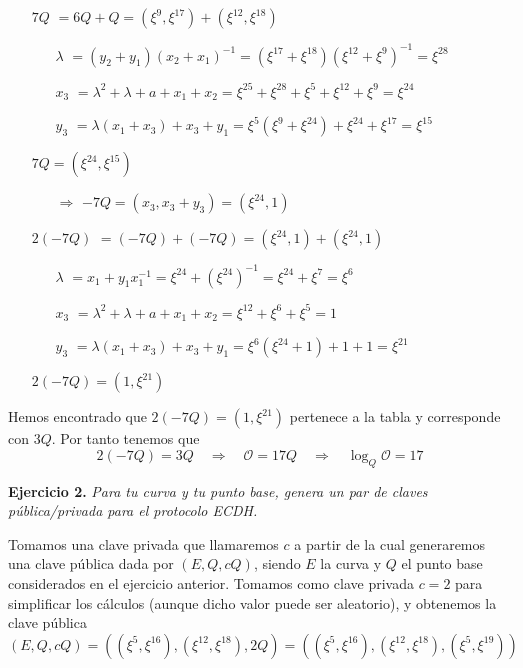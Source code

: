 \documentclass[fleqn]{article}
\def\next{\quad \Rightarrow \quad}
\begin{document}
    \begin{itemize}
        \item[$7Q$] $ = 6Q + Q = (\xi^{9}, \xi^{17}) + (\xi^{12}, \xi^{18})$
            \begin{itemize}
                \item[$\lambda$] $ = (y_2 + y_1)(x_2 + x_1)^{-1} = (\xi^{17} + \xi^{18})(\xi^{12} + \xi^{9})^{-1} = \xi^{28}$
                \item[$x_3$] $ = \lambda^2 + \lambda + a + x_1 + x_2 = \xi^{25} + \xi^{28} + \xi^{5} + \xi^{12} + \xi^{9} = \xi^{24}$
                \item[$y_3$] $ = \lambda(x_1 + x_3) + x_3 + y_1 = \xi^{5} (\xi^{9} + \xi^{24}) + \xi^{24} + \xi^{17} = \xi^{15}$
            \end{itemize}
            $7Q = (\xi^{24}, \xi^{15})$
            \begin{itemize}
                \item[$\Rightarrow$] $-7Q = (x_3, x_3 + y_3) = (\xi^{24}, 1)$
            \end{itemize}
        \item[$2(-7Q)$] $ = (-7Q) + (-7Q) = (\xi^{24}, 1) + (\xi^{24}, 1)$
            \begin{itemize}
                \item[$\lambda$] $ = x_1 + y_1x_1^{-1} = \xi^{24} + (\xi^{24})^{-1} = \xi^{24} + \xi^{7} = \xi^{6}$
                \item[$x_3$] $ = \lambda^2 + \lambda + a + x_1 + x_2 = \xi^{12} + \xi^{6} + \xi^{5} = 1$
                \item[$y_3$] $ = \lambda(x_1 + x_3) + x_3 + y_1 = \xi^{6} (\xi^{24} + 1) + 1 + 1 = \xi^{21}$
            \end{itemize}
            $2(-7Q) = (1, \xi^{21})$
    \end{itemize}

    Hemos encontrado que $2(-7Q) = (1, \xi^{21})$ pertenece a la tabla y corresponde con $3Q$. Por tanto tenemos que
    $$2(-7Q) = 3Q \next \mathcal{O} = 17Q \next \log_Q \mathcal{O} = 17$$


    \newpage
    \textbf{Ejercicio 2. }\textit{Para tu curva y tu punto base, genera un par de claves pública/privada para el protocolo ECDH.}
    \vspace{0.5cm}

    Tomamos una clave privada que llamaremos $c$ a partir de la cual generaremos una clave pública dada por $(E, Q, cQ)$, siendo $E$ la curva
    y $Q$ el punto base considerados en el ejercicio anterior. Tomamos como clave privada $c = 2$ para simplificar los cálculos (aunque dicho valor puede ser aleatorio), 
    y obtenemos la clave pública 
    $$(E, Q, cQ) = ((\xi^5, \xi^{16}), (\xi^{12}, \xi^{18}), 2Q) = ((\xi^5, \xi^{16}), (\xi^{12}, \xi^{18}), (\xi^{5}, \xi^{19}))$$
\end{document}
